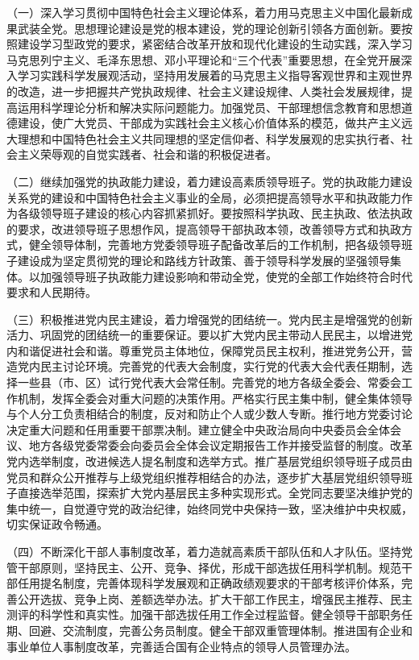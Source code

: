 （一）深入学习贯彻中国特色社会主义理论体系，着力用马克思主义中国化最新成果武装全党。思想理论建设是党的根本建设，党的理论创新引领各方面创新。要按照建设学习型政党的要求，紧密结合改革开放和现代化建设的生动实践，深入学习马克思列宁主义、毛泽东思想、邓小平理论和“三个代表”重要思想，在全党开展深入学习实践科学发展观活动，坚持用发展着的马克思主义指导客观世界和主观世界的改造，进一步把握共产党执政规律、社会主义建设规律、人类社会发展规律，提高运用科学理论分析和解决实际问题能力。加强党员、干部理想信念教育和思想道德建设，使广大党员、干部成为实践社会主义核心价值体系的模范，做共产主义远大理想和中国特色社会主义共同理想的坚定信仰者、科学发展观的忠实执行者、社会主义荣辱观的自觉实践者、社会和谐的积极促进者。

（二）继续加强党的执政能力建设，着力建设高素质领导班子。党的执政能力建设关系党的建设和中国特色社会主义事业的全局，必须把提高领导水平和执政能力作为各级领导班子建设的核心内容抓紧抓好。要按照科学执政、民主执政、依法执政的要求，改进领导班子思想作风，提高领导干部执政本领，改善领导方式和执政方式，健全领导体制，完善地方党委领导班子配备改革后的工作机制，把各级领导班子建设成为坚定贯彻党的理论和路线方针政策、善于领导科学发展的坚强领导集体。以加强领导班子执政能力建设影响和带动全党，使党的全部工作始终符合时代要求和人民期待。

（三）积极推进党内民主建设，着力增强党的团结统一。党内民主是增强党的创新活力、巩固党的团结统一的重要保证。要以扩大党内民主带动人民民主，以增进党内和谐促进社会和谐。尊重党员主体地位，保障党员民主权利，推进党务公开，营造党内民主讨论环境。完善党的代表大会制度，实行党的代表大会代表任期制，选择一些县（市、区）试行党代表大会常任制。完善党的地方各级全委会、常委会工作机制，发挥全委会对重大问题的决策作用。严格实行民主集中制，健全集体领导与个人分工负责相结合的制度，反对和防止个人或少数人专断。推行地方党委讨论决定重大问题和任用重要干部票决制。建立健全中央政治局向中央委员会全体会议、地方各级党委常委会向委员会全体会议定期报告工作并接受监督的制度。改革党内选举制度，改进候选人提名制度和选举方式。推广基层党组织领导班子成员由党员和群众公开推荐与上级党组织推荐相结合的办法，逐步扩大基层党组织领导班子直接选举范围，探索扩大党内基层民主多种实现形式。全党同志要坚决维护党的集中统一，自觉遵守党的政治纪律，始终同党中央保持一致，坚决维护中央权威，切实保证政令畅通。

（四）不断深化干部人事制度改革，着力造就高素质干部队伍和人才队伍。坚持党管干部原则，坚持民主、公开、竞争、择优，形成干部选拔任用科学机制。规范干部任用提名制度，完善体现科学发展观和正确政绩观要求的干部考核评价体系，完善公开选拔、竞争上岗、差额选举办法。扩大干部工作民主，增强民主推荐、民主测评的科学性和真实性。加强干部选拔任用工作全过程监督。健全领导干部职务任期、回避、交流制度，完善公务员制度。健全干部双重管理体制。推进国有企业和事业单位人事制度改革，完善适合国有企业特点的领导人员管理办法。

